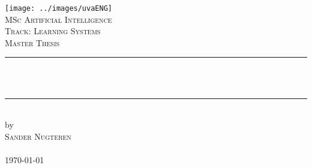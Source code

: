 \documentclass{article}
\newcommand{\red}[1]{{\color{red}{#1}}}
\begin{document}
\begin{titlepage}

\newcommand{\HRule}{\rule{\linewidth}{0.5mm}} %
\center %
 

\texttt{[image: ../images/uvaENG]}\\[2.5cm]
\textsc{\Large MSc Artificial Intelligence}\\[0.2cm]
\textsc{\normalsize Track: Learning Systems}\\[1.0cm] %
\textsc{\Large Master Thesis}\\[0.5cm] 


\HRule \\[0.4cm]
{ \huge \bfseries \red{PrInCESS: extracting rules from story synopses}}\\[0.4cm] %
\HRule \\[0.5cm]
 

by\\[0.2cm]
\textsc{\Large Sander Nugteren}\\[0.2cm] %
\red{6042023}\\[1cm]



{\Large \today}\\[1cm] %

\red{42 EC}\\ %
\red{April 2015-June 2016}\\[1cm]%


\end{titlepage}
\end{document}
